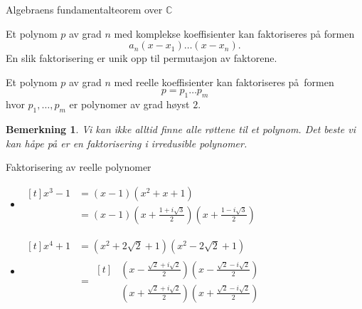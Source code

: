 \documentclass[norsk]{beamer}
\theoremstyle{example}
\newtheorem{remark}{Bemerkning}
\begin{document}
\begin{frame}{Algebraens fundamentalteorem over $\mathbb C$}
    \begin{theorem}
        Et polynom $p$ av grad $n$ med komplekse koeffisienter kan faktoriseres
        på formen
        \[
            a_n (x - x_1)\dots(x - x_n).
        \]
        En slik faktorisering er unik opp til permutasjon av faktorene.
    \end{theorem}
    \pause
    \begin{corollary}
        Et polynom $p$ av grad $n$ med reelle koeffisienter kan
        faktoriseres på formen
        \[
            p = p_1\dots p_m
        \]
        hvor $p_1,\dots, p_m$ er polynomer av grad høyst $2$.
    \end{corollary}
    \pause
    \begin{remark}
        Vi kan ikke alltid finne alle røttene til et polynom.
        Det beste vi kan håpe på er en faktorisering i irredusible polynomer.
    \end{remark}
\end{frame}

\begin{frame}{Faktorisering av reelle polynomer}
    \begin{example}
        \begin{itemize}
            \item $\begin{aligned}[t]
                    x^3 - 1
                    &= (x - 1)(x^2 + x + 1)
                    \\
                    &= (x - 1)\left(x + \frac{1 + i\sqrt 3} 2\right)\left(x + \frac {1 - i\sqrt 3} 2\right)\end{aligned}$
            \pause\item $\begin{aligned}[t]
                    x^4 + 1
                    &= (x^2 + 2\sqrt 2 + 1)(x^2 - 2\sqrt 2 + 1)\\
                    &=\begin{aligned}[t]
                        &\left(x - \frac {\sqrt 2 + i\sqrt 2}{2}\right)
                        \left(x - \frac {\sqrt 2 - i\sqrt 2}{2}\right)\\
                        &\left(x + \frac {\sqrt 2 + i\sqrt 2}{2}\right)
                        \left(x + \frac {\sqrt 2 - i\sqrt 2}{2}\right)
                    \end{aligned}
                \end{aligned}$
        \end{itemize}
    \end{example}
\end{frame}
\end{document}
